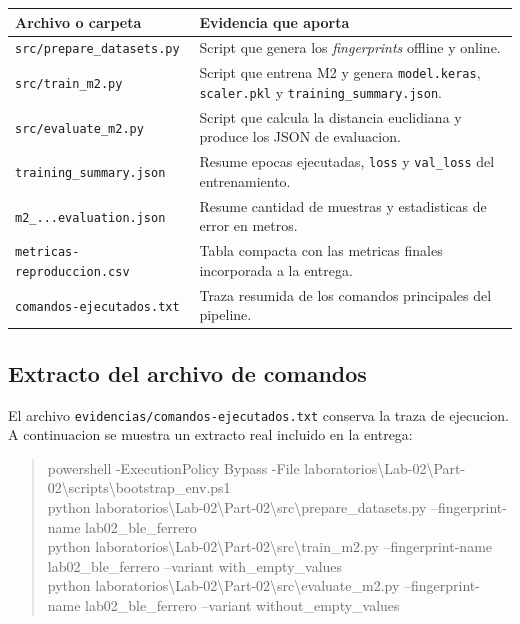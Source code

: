 \documentclass[11pt,a4paper]{article}
\begin{document}
\begin{center}
\small
\begin{tabular}{>{\raggedright\arraybackslash}p{3.9cm}p{9.0cm}}
\toprule
Archivo o carpeta & Evidencia que aporta \\
\midrule
\texttt{src/prepare\_datasets.py} & Script que genera los \textit{fingerprints} offline y online. \\
\texttt{src/train\_m2.py} & Script que entrena M2 y genera \texttt{model.keras}, \texttt{scaler.pkl} y \texttt{training\_summary.json}. \\
\texttt{src/evaluate\_m2.py} & Script que calcula la distancia euclidiana y produce los JSON de evaluacion. \\
\texttt{training\_summary.json} & Resume epocas ejecutadas, \texttt{loss} y \texttt{val\_loss} del entrenamiento. \\
\texttt{m2\_...evaluation.json} & Resume cantidad de muestras y estadisticas de error en metros. \\
\texttt{metricas-reproduccion.csv} & Tabla compacta con las metricas finales incorporada a la entrega. \\
\texttt{comandos-ejecutados.txt} & Traza resumida de los comandos principales del pipeline. \\
\bottomrule
\end{tabular}
\end{center}

\subsection*{Extracto del archivo de comandos}
El archivo \texttt{evidencias/comandos-ejecutados.txt} conserva la traza de ejecucion. A continuacion se muestra un extracto real incluido en la entrega:

\begin{quote}
\ttfamily\footnotesize
powershell -ExecutionPolicy Bypass -File laboratorios\textbackslash Lab-02\textbackslash Part-02\textbackslash scripts\textbackslash bootstrap\_env.ps1\\
python laboratorios\textbackslash Lab-02\textbackslash Part-02\textbackslash src\textbackslash prepare\_datasets.py --fingerprint-name lab02\_ble\_ferrero\\
python laboratorios\textbackslash Lab-02\textbackslash Part-02\textbackslash src\textbackslash train\_m2.py --fingerprint-name lab02\_ble\_ferrero --variant with\_empty\_values\\
python laboratorios\textbackslash Lab-02\textbackslash Part-02\textbackslash src\textbackslash evaluate\_m2.py --fingerprint-name lab02\_ble\_ferrero --variant without\_empty\_values
\end{quote}
\end{document}
